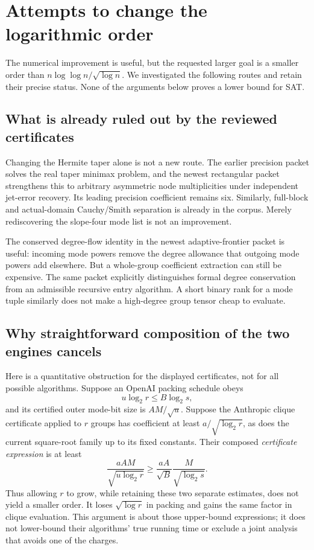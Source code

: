 \section{Attempts to change the logarithmic order}
\label{sec:order-research}

The numerical improvement is useful, but the requested larger goal is a
smaller order than $n\log\log n/\sqrt{\log n}$. We investigated the
following routes and retain their precise status. None of the arguments
below proves a lower bound for SAT.

\subsection{What is already ruled out by the reviewed certificates}

Changing the Hermite taper alone is not a new route. The earlier precision
packet solves the real taper minimax problem, and the newest rectangular
packet strengthens this to arbitrary asymmetric node multiplicities under
independent jet-error recovery. Its leading precision coefficient remains
six. Similarly, full-block and actual-domain Cauchy/Smith separation is
already in the corpus. Merely rediscovering the slope-four mode list is
not an improvement.

The conserved degree-flow identity in the newest adaptive-frontier packet
is useful: incoming mode powers remove the degree allowance that outgoing
mode powers add elsewhere. But a whole-group coefficient extraction can
still be expensive. The same packet explicitly distinguishes formal
degree conservation from an admissible recursive entry algorithm. A short
binary rank for a mode tuple similarly does not make a high-degree group
tensor cheap to evaluate.

\subsection{Why straightforward composition of the two engines cancels}

Here is a quantitative obstruction for the displayed certificates, not
for all possible algorithms. Suppose an OpenAI packing schedule obeys
\[
 u\log_2 r\le B\log_2s,
\]
and its certified outer mode-bit size is $A M/\sqrt u$. Suppose the
Anthropic clique certificate applied to $r$ groups has coefficient at
least $a/\sqrt{\log_2r}$, as does the current square-root family up to
its fixed constants. Their composed \emph{certificate expression} is
at least
\[
 \frac{aAM}{\sqrt{u\log_2r}}
 \ge\frac{aA}{\sqrt B}\frac{M}{\sqrt{\log_2s}}.
\]
Thus allowing $r$ to grow, while retaining these two separate estimates,
does not yield a smaller order. It loses $\sqrt{\log r}$ in packing and
gains the same factor in clique evaluation. This argument is about those
upper-bound expressions; it does not lower-bound their algorithms' true
running time or exclude a joint analysis that avoids one of the charges.


